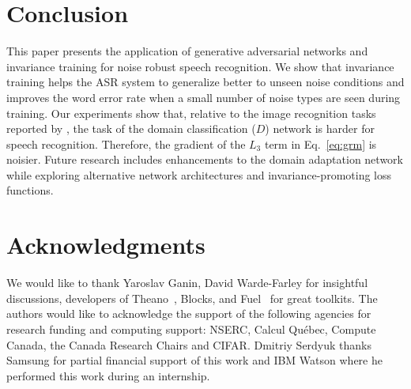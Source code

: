 \documentclass[a4paper]{article}
\begin{document}
\section{Conclusion}
\label{sec:discussion}
    This paper presents the application of generative adversarial networks and 
    invariance training for noise robust speech recognition. We show that invariance training 
    helps the ASR system to generalize better to unseen noise conditions and improves 
    the word error rate when a small number of noise types are seen during training. Our 
    experiments show that, relative to the image recognition tasks reported
    by \cite{ganin2014unsupervised}, the task of the domain classification ($D$) network is
    harder for speech recognition. Therefore, the 
    gradient of the $L_3$ term in Eq.~\ref{eq:grm} is noisier. Future 
    research includes enhancements to the domain adaptation network while exploring 
    alternative network architectures and invariance-promoting loss functions.

\section{Acknowledgments}

We would like to thank Yaroslav Ganin, David Warde-Farley for insightful discussions,
developers of Theano~\cite{theano2016theano}, Blocks, and Fuel~\cite{MerrienboerBDSW15} 
for great toolkits. 
The authors would like to acknowledge the support of the following agencies for
research funding and computing support: NSERC, Calcul Qu\'{e}bec, Compute Canada,
the Canada Research Chairs and CIFAR. Dmitriy Serdyuk thanks Samsung for partial
financial support of this work and IBM Watson where he performed this work 
during an internship.




\end{document}
